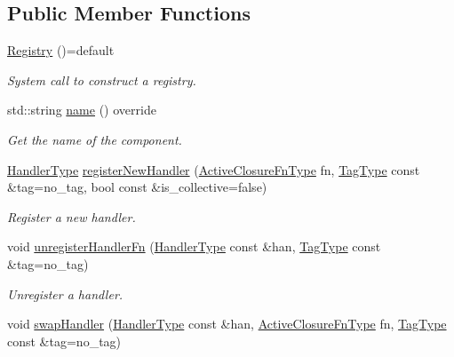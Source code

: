\subsection*{Public Member Functions}
\begin{DoxyCompactItemize}
\item 
\hyperlink{structvt_1_1registry_1_1_registry_a319ac9c59641bee88d48e825a4840aa2}{Registry} ()=default
\begin{DoxyCompactList}\small\item\em System call to construct a registry. \end{DoxyCompactList}\item 
std\+::string \hyperlink{structvt_1_1registry_1_1_registry_a8488eb3ab95e207094617027bb5c75c9}{name} () override
\begin{DoxyCompactList}\small\item\em Get the name of the component. \end{DoxyCompactList}\item 
\hyperlink{namespacevt_af64846b57dfcaf104da3ef6967917573}{Handler\+Type} \hyperlink{structvt_1_1registry_1_1_registry_a2e3b140ef858712eb34deb89623cbbc3}{register\+New\+Handler} (\hyperlink{namespacevt_a2a06c34cafcd511828f16cbf1476b924}{Active\+Closure\+Fn\+Type} fn, \hyperlink{namespacevt_a84ab281dae04a52a4b243d6bf62d0e52}{Tag\+Type} const \&tag=no\+\_\+tag, bool const \&is\+\_\+collective=false)
\begin{DoxyCompactList}\small\item\em Register a new handler. \end{DoxyCompactList}\item 
void \hyperlink{structvt_1_1registry_1_1_registry_adaee9715edeb66b2fc8cd4639288a1cd}{unregister\+Handler\+Fn} (\hyperlink{namespacevt_af64846b57dfcaf104da3ef6967917573}{Handler\+Type} const \&han, \hyperlink{namespacevt_a84ab281dae04a52a4b243d6bf62d0e52}{Tag\+Type} const \&tag=no\+\_\+tag)
\begin{DoxyCompactList}\small\item\em Unregister a handler. \end{DoxyCompactList}\item 
void \hyperlink{structvt_1_1registry_1_1_registry_affe7c413b570120f7ccb0af95d6e9181}{swap\+Handler} (\hyperlink{namespacevt_af64846b57dfcaf104da3ef6967917573}{Handler\+Type} const \&han, \hyperlink{namespacevt_a2a06c34cafcd511828f16cbf1476b924}{Active\+Closure\+Fn\+Type} fn, \hyperlink{namespacevt_a84ab281dae04a52a4b243d6bf62d0e52}{Tag\+Type} const \&tag=no\+\_\+tag)

\end{DoxyCompactItemize}

